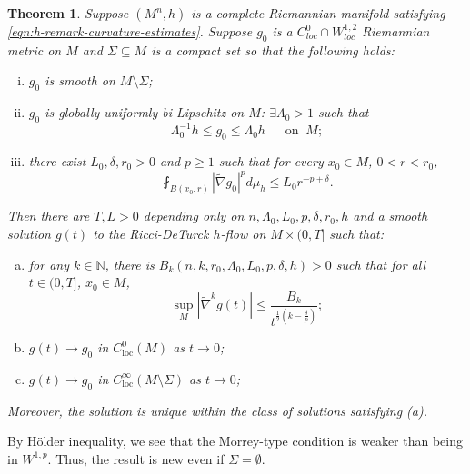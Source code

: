 \documentclass[12pt]{amsart}
\theoremstyle{plain}
\newtheorem{theorem}[subsection]{Theorem}
\theoremstyle{plain}
\theoremstyle{definition}
\theoremstyle{remark}
\numberwithin{equation}{subsection}
\newcommand{\hdel}{\tilde{\nabla}}
\begin{document}
\begin{theorem}\label{thm:intro-application-1-statement}
    Suppose $(M^n, h)$ is a complete Riemannian manifold satisfying \eqref{eqn:h-remark-curvature-estimates}. Suppose $g_0$ is a $C^0_{loc}\cap W^{1,2}_{loc}$ Riemannian metric on $M$ and $\Sigma \subseteq M$ is a compact set so that the following holds:
    \begin{enumerate}[(i)]
        \item $g_0$ is smooth on $M \setminus \Sigma$;
        \item $g_0$ is globally uniformly bi-Lipschitz on $M$: 
         $\exists\Lambda_0 > 1$ such that $$\Lambda_0^{-1} h \leq g_0 \leq \Lambda_0 h\;\;\quad\text{on}\;\;M;$$
        \item there exist $L_0,\delta,r_0 > 0$ and $p\geq 1$ such that for every $x_0 \in M$, $0 < r < r_0$,
        \begin{equation*}
            \fint_{B(x_0,r)} |\hdel g_0|^p d\mu_h \leq L_0 r^{-p+\delta}.
        \end{equation*}
    \end{enumerate}
    Then there are $T,L>0$ depending only on  $n, \Lambda_0, L_0, p, \delta, r_0,h$ and a smooth solution $g(t)$ to the Ricci-DeTurck $h$-flow on $M\times(0,T]$ such that:
        \begin{enumerate}[(a)]
            \item for any $k \in \mathbb{N}$, there is $B_k(n, k,r_0, \Lambda_0, L_0, p, \delta,h) > 0$ such that for all $t \in (0, T]$, $x_0 \in M$,
            \begin{equation*}
                \sup\limits_{M}|\hdel^k g(t)| \leq \frac{B_k}{t^{\frac{1}{2}(k-\frac{\delta}{p})}};
            \end{equation*}
            \item $g(t) \to g_0$ in $C_\text{loc}^0(M)$ as $t \to 0$;
            \item $g(t) \to g_0$ in $C_\text{loc}^\infty(M\setminus\Sigma)$ as $t \to 0$;
        \end{enumerate}
        Moreover, the solution is unique within the class of solutions satisfying (a).
\end{theorem}

By H\"older inequality, we see that the Morrey-type condition is weaker than being in $W^{1,p}$. Thus, the result is new even if $\Sigma=\emptyset$.
\end{document}
